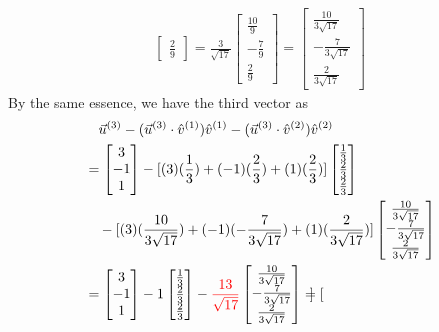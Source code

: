 \begin{solution}
\begin{align*}
\begin{bmatrix}
\frac{2}{9}
\end{bmatrix}
=
\frac{3}{\sqrt{17}}
\begin{bmatrix}
\frac{10}{9} \\
-\frac{7}{9} \\
\frac{2}{9}
\end{bmatrix}
=
\begin{bmatrix}
\frac{10}{3\sqrt{17}} \\
-\frac{7}{3\sqrt{17}}\\
\frac{2}{3\sqrt{17}}
\end{bmatrix}
\end{align*}
By the same essence, we have the third vector as
\begin{align*}
&\quad \vec{u}^{(3)} - (\vec{u}^{(3)} \cdot \hat{v}^{(1)})\hat{v}^{(1)} - (\vec{u}^{(3)} \cdot \hat{v}^{(2)})\hat{v}^{(2)}\\
&=
\begin{bmatrix}
3 \\
-1 \\
1
\end{bmatrix}
-
[(3)(\frac{1}{3}) + (-1)(\frac{2}{3}) + (1)(\frac{2}{3})]
\begin{bmatrix}
\frac{1}{3} \\
\frac{2}{3} \\
\frac{2}{3}
\end{bmatrix} \\
&\quad -
[(3)(\frac{10}{3\sqrt{17}}) + (-1)(-\frac{7}{3\sqrt{17}}) + (1)(\frac{2}{3\sqrt{17}})]
\begin{bmatrix}
\frac{10}{3\sqrt{17}} \\
-\frac{7}{3\sqrt{17}} \\
\frac{2}{3\sqrt{17}}
\end{bmatrix} \\
&=
\begin{bmatrix}
3 \\
-1 \\
1
\end{bmatrix}
- 1
\begin{bmatrix}
\frac{1}{3} \\
\frac{2}{3} \\
\frac{2}{3}
\end{bmatrix}
-
\textcolor{red}{\frac{13}{\sqrt{17}}}
\begin{bmatrix}
\frac{10}{3\sqrt{17}} \\
-\frac{7}{3\sqrt{17}} \\
\frac{2}{3\sqrt{17}}
\end{bmatrix}
=
\begin{bmatrix}

\end{bmatrix}
\end{align*}
\end{solution}
